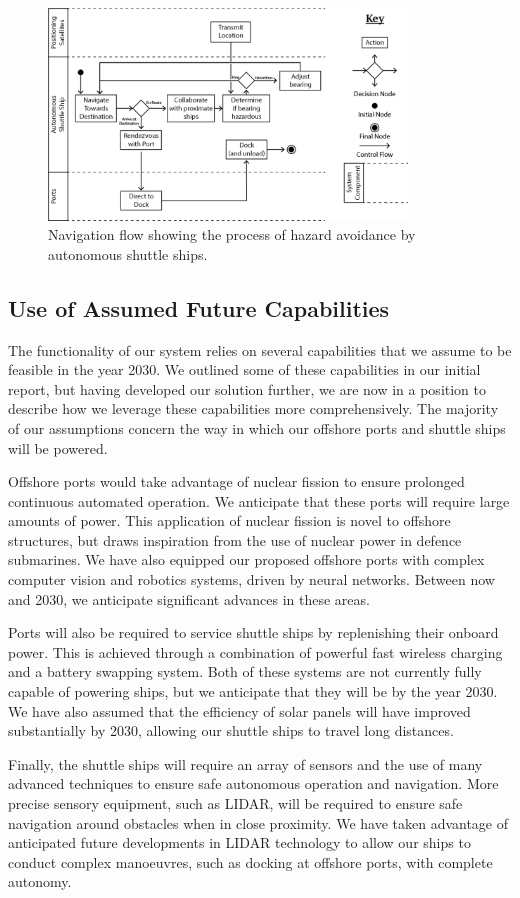 \begin{figure}[h!]
\centering
	\includegraphics[width=0.85\textwidth]{images/arch_3}
	\caption{Navigation flow showing the process of hazard avoidance by autonomous shuttle ships.}
	\label{fig:arch_3}
\end{figure}

\newpage
\subsection{Use of Assumed Future Capabilities}

The functionality of our system relies on several capabilities that we assume to be feasible in the year 2030. We outlined some of these capabilities in our initial report, but having developed our solution further, we are now in a position to describe how we leverage these capabilities more comprehensively. The majority of our assumptions concern the way in which our offshore ports and shuttle ships will be powered.

Offshore ports would take advantage of nuclear fission to ensure prolonged continuous automated operation. We anticipate that these ports will require large amounts of power. This application of nuclear fission is novel to offshore structures, but draws inspiration from the use of nuclear power in defence submarines. We have also equipped our proposed offshore ports with complex computer vision and robotics systems, driven by neural networks. Between now and 2030, we anticipate significant advances in these areas.

Ports will also be required to service shuttle ships by replenishing their onboard power. This is achieved through a combination of powerful fast wireless charging and a battery swapping system. Both of these systems are not currently fully capable of powering ships, but we anticipate that they will be by the year 2030. We have also assumed that the efficiency of solar panels will have improved substantially by 2030, allowing our shuttle ships to travel long distances.

Finally, the shuttle ships will require an array of sensors and the use of many advanced techniques to ensure safe autonomous operation and navigation. More precise sensory equipment, such as LIDAR, will be required to ensure safe navigation around obstacles when in close proximity. We have taken advantage of anticipated future developments in LIDAR technology to allow our ships to conduct complex manoeuvres, such as docking at offshore ports, with complete autonomy.
